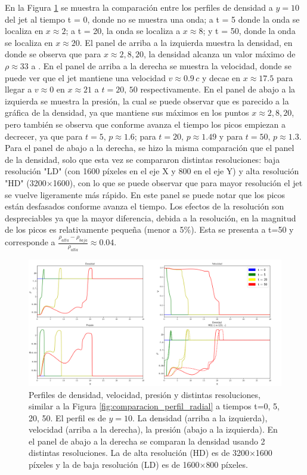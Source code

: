 \documentclass[12pt,a4paper]{book}
\begin{document}
En la Figura \ref{fig:Decaimiento_constante_densidad_jet} se muestra la comparación entre los perfiles de 
densidad a $y = 10$
del jet al tiempo t = 0, donde no se muestra una onda; a t = 5 donde la onda se localiza en $x \approx 2$; 
a t = 20, la onda se localiza a $x \approx 8$; y  t = 50, donde la onda se localiza en $x \approx 20$. 
El panel de arriba a la izquierda muestra la densidad, en donde
se observa que para $x \approx 2, 8, 20$, la densidad alcanza un valor máximo de 
$\rho  \approx 33$ a .
En el panel de arriba a la derecha se muestra la velocidad, donde se puede ver que el jet mantiene una velocidad 
$v \approx 0.9 \, c$ y decae en $x \approx 17.5$ para llegar a $v \approx 0 $ en  $x \approx 21$ a $t = 20, \, 50$ respectivamente. 
En el panel de abajo a la
izquierda se muestra la presión, la cual se puede observar que es parecido a la gráfica de la 
densidad, ya que mantiene sus máximos en los puntos $x \approx 2, 8, 20$, pero también se observa que conforme avanza el
tiempo los picos empiezan a decrecer, ya que para $t = 5, \, p \approx 1.6 $; 
para $t = 20, \, p \approx 1.49$ y para 
$t = 50, \, p  \approx 1.3$. Para el panel de abajo a la derecha, se hizo la misma comparación que el panel 
de la densidad, solo que esta vez se compararon  distintas resoluciones: baja resolución "LD" (con 1600 píxeles en el eje X y 800 en el eje Y) 
y alta resolución "HD" (3200$\times$1600), con lo que se puede observar que 
para mayor resolución el jet se vuelve ligeramente más rápido. En este panel se puede notar que
los picos están desfasados conforme avanza el tiempo. Los efectos de la resolución son despreciables ya 
que la mayor diferencia, debida a la resolución, en la magnitud de los picos es relativamente pequeña (menor a 5\%). Esta se presenta a t=50 y corresponde a $\frac{\rho_{alta} - \rho_{baja}}{\rho_{alta}} \approx 0.04$.


\begin{figure}
  \centering
  \includegraphics[width = 1.0\textwidth]{./Figuras/jet/perfiles/perfiles_constantes.png}
  \caption{Perfiles de densidad, velocidad, presión y distintas resoluciones, similar a la Figura 
  \ref{fig:comparacion_perfil_radial} a tiempos t=0, 5, 20, 50.
  El perfil es de $y = 10$.
  La densidad (arriba a la izquierda), velocidad (arriba a la derecha), la presión (abajo a la izquierda). 
  En el panel de abajo a la derecha se comparan la densidad usando 2 distintas resoluciones. La de alta resolución 
  (HD)
  es de 3200$\times$1600 píxeles y la de baja resolución (LD) es de 1600$\times$800 píxeles.}\label{fig:Decaimiento_constante_densidad_jet}
\end{figure}
\end{document}
